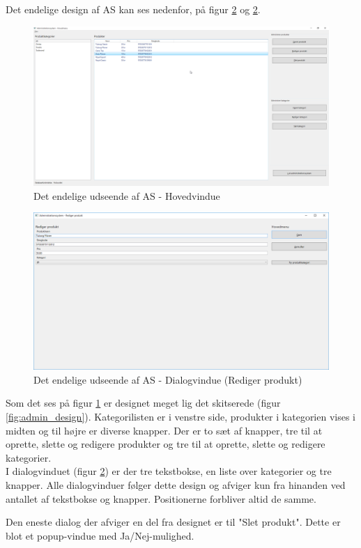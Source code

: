 Det endelige design af \gls{AS} kan ses nedenfor, på figur \ref{fig:admin_final_dialog} og \ref{fig:admin_final_dialog}.

\begin{figure}[H]
	\centering
	\includegraphics[width=1\textwidth]{Systemdesign/backend/Images/AdminDesignHovedvindue}
	\caption{Det endelige udseende af \gls{AS} - Hovedvindue}
	\label{fig:admin_final_hovedvindue}
\end{figure}

\begin{figure}[H]
	\centering
	\includegraphics[width=1\textwidth]{Systemdesign/backend/Images/AdminDesignRedigerProdukt}
	\caption{Det endelige udseende af \gls{AS} - Dialogvindue (Rediger produkt)}
	\label{fig:admin_final_dialog}
\end{figure}

Som det ses på figur \ref{fig:admin_final_hovedvindue} er designet meget lig det skitserede (figur \ref{fig:admin_design}). Kategorilisten er i venstre side, produkter i kategorien vises i midten og til højre er diverse knapper. Der er to sæt af knapper, tre til at oprette, slette og redigere produkter og tre til at oprette, slette og redigere kategorier.\\

I dialogvinduet (figur \ref{fig:admin_final_dialog}) er der tre tekstbokse, en liste over kategorier og tre knapper. Alle dialogvinduer følger dette design og afviger kun fra hinanden ved antallet af tekstbokse og knapper. Positionerne forbliver altid de samme.

Den eneste dialog der afviger en del fra designet er til "Slet produkt". Dette er blot et popup-vindue med Ja/Nej-mulighed.